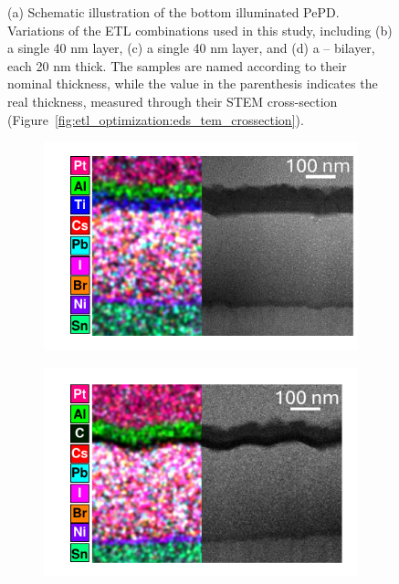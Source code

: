 \begin{figure}[htbp]
    \caption[Schematic illustration of ETL combinations used in this study.]{(a) Schematic illustration of the bottom illuminated PePD. Variations of the ETL combinations used in this study, including (b) a single 40 nm  layer, (c) a single 40 nm  layer, and (d) a  –  bilayer, each 20 nm thick. The samples are named according to their nominal thickness, while the value in the parenthesis indicates the real thickness, measured through their STEM cross-section (Figure~\ref{fig:etl_optimization:eds_tem_crossection}).}
    \label{fig:etl_optimization:stacks}
\end{figure}

\begin{figure}[ht!]
    \centering
    \begin{subfigure}[t]{0.45\textwidth}
        \centering
        \includegraphics[width=\textwidth]{chapters/transport_layers/images/EDS_TEM_TiO2.pdf} %
        \caption{}
        \label{}
    \end{subfigure}
    \hspace{0.5cm}
    \begin{subfigure}[t]{0.45\textwidth}
        \centering
        \includegraphics[width=\textwidth]{chapters/transport_layers/images/EDS_TEM_C60.pdf} 

\end{subfigure}
\end{figure}

